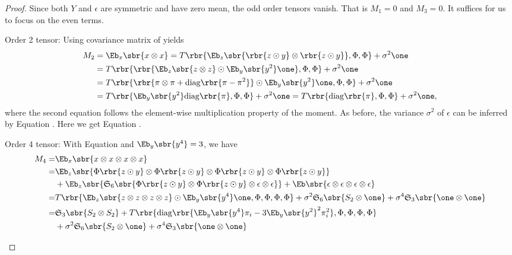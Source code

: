 \documentclass[twoside,11pt]{article}
\newcommand{\symm}{\mathfrak{S}}
\begin{document}
{\begin{proof}
Since both $Y$ and $\epsilon$ are symmetric and have zero mean, the
odd order tensors vanish. That is $M_1 = 0$ and $M_3 = 0$. It suffices
for us to focus on the even terms.
\begin{description*}
\item[Order 2 tensor:] Using covariance matrix of  yields
  \begin{align} 
    M_2 &= \Eb_x \sbr{x \otimes x} = T\rbr{ \Eb_z{ \sbr{ \rbr{z \odot y} \otimes \rbr{z \odot y} }},\Phi,\Phi }+ \sigma^2\one \\
    &=   T\rbr{ \rbr{ \Eb_z{\sbr{z \otimes z}} \odot  \Eb_y \sbr{y^2} \one},\Phi, \Phi } + \sigma^2\one  \\
    &=T \rbr{ \rbr{ \pi \otimes \pi + \mathrm{diag}\rbr{\pi -\pi^2}} \odot \Eb_y \sbr{y^2} \one, \Phi,\Phi}  + \sigma^2\one \\
    \label{eq:y2}
    & =  T\rbr{\Eb_y \sbr{y^2} \mathrm{diag}\rbr{\pi}, \Phi,\Phi} +\sigma^2\one =  T\rbr{\mathrm{diag}\rbr{\pi}, \Phi,\Phi} +\sigma^2\one,
  \end{align}
  where the second equation follows the element-wise multiplication property of the moment.
  As before, the variance $\sigma^2$ of $\epsilon$ can be inferred by
  Equation . Here we get Equation
  . 
\item[Order 4 tensor:] With Equation  and $\Eb_y\sbr{y^4} = 3$, we have 
\begin{align}
  M_4 =& \Eb_x \sbr{x \otimes x \otimes x \otimes x} \nonumber\\
  =& \Eb_z{ \sbr{ \Phi \rbr{z \odot y} \otimes \Phi \rbr{z \odot y} \otimes
      \Phi \rbr{z \odot y} \otimes \Phi \rbr{z \odot y} }} \nonumber\\
  \nonumber
  & +\Eb_z{ \sbr{ \symm_6\sbr{ \Phi \rbr{z \odot y} \otimes \Phi \rbr{z \odot y} \otimes \epsilon \otimes \epsilon} }} +  \Eb \sbr{\epsilon\otimes \epsilon \otimes \epsilon\otimes \epsilon} \nonumber\\
  =& T\rbr{\Eb_z \sbr{z \otimes z \otimes z \otimes z} \odot \Eb_y \sbr{y^4} \one,\Phi , \Phi, \Phi, \Phi} + \sigma^2\symm_6\sbr{S_2 \otimes \one} +   \sigma^4 \symm_3 \sbr{\one\otimes \one}\nonumber\\
 =&   \symm_3 \sbr{S_2 \otimes S_2} +T\rbr{ \mathrm{diag}
   \rbr{\Eb_y\sbr{y^4} \pi_i - 3\Eb_y\sbr{y^2}^2 \pi_i^2}, \Phi, \Phi, \Phi, \Phi }
\nonumber\\
 \label{eq:y4}
 & + \sigma^2 \symm_6\sbr{S_2 \otimes \one} +  \sigma^4 \symm_3 \sbr{\one\otimes \one}  \\

\end{align}
\end{description*}
\end{proof}}
\end{document}
